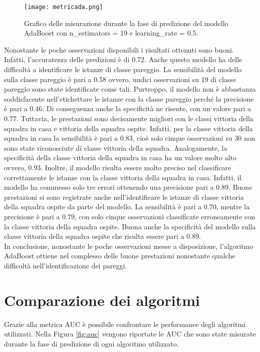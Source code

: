 \begin{figure}[h]
	\begin{center}
		\texttt{[image: metricada.png]}
		\caption{Grafico delle misurazione durante la fase di predizione del modello AdaBoost con \textsf{n\_estimators} = 19 e \textsf{learning\_rate} = 0.5.
		} 
		\label{fig:adametrics}
	\end{center}
\end{figure}
Nonostante le poche osservazioni disponibili i risultati ottenuti sono buoni. Infatti, l'accuratezza delle predizioni è di 0.72. Anche questo modello ha delle difficoltà a identificare le istanze di classe pareggio. La sensibilità del modello sulla classe pareggio è pari a 0.58 ovvero, undici osservazioni su 19 di classe pareggio sono state identificate come tali. Purtroppo, il modello non è abbastanza soddisfacente nell’etichettare le istanze con la classe pareggio perché la precisione è pari a 0.46. Di conseguenza anche la specificità ne risente, con un valore pari a 0.77. Tuttavia, le prestazioni sono decisamente migliori con le classi vittoria della squadra in casa e vittoria della squadra ospite. Infatti, per la classe vittoria della squadra in casa la sensibilità è pari a 0.83, cioè solo cinque osservazioni su 30 non sono state riconosciute di classe vittoria della squadra. Analogamente, la specificità della classe vittoria della squadra in casa ha un valore molto alto ovvero, 0.93. Inoltre, il modello risulta essere molto preciso nel classificare correttamente le istanze con la classe vittoria della squadra in casa. Infatti, il modello ha commesso solo tre errori ottenendo una precisione pari a 0.89. Buone prestazioni si sono registrate anche nell'identificare le istanze di classe vittoria della squadra ospite da parte del modello. La sensibilità è pari a 0.70, mentre la precisione è pari a 0.79, con solo cinque osservazioni classificate erroneamente con la classe vittoria della squadra ospite. Buona anche la specificità del modello sulla classe vittoria della squadra ospite che risulta essere pari a 0.89.\\
In conclusione, nonostante le poche osservazioni messe a disposizione, l'algoritmo AdaBoost ottiene nel complesso delle buone prestazioni nonostante qualche difficoltà nell’identificazione dei pareggi.

\section{Comparazione dei algoritmi}
Grazie alla metrica AUC è possibile confrontare le performance degli algoritmi utilizzati. 
Nella Figura \ref{fig:auc} vengono riportate le AUC che sono state misurate durante la fase di predizione di ogni algoritmo utilizzato.

